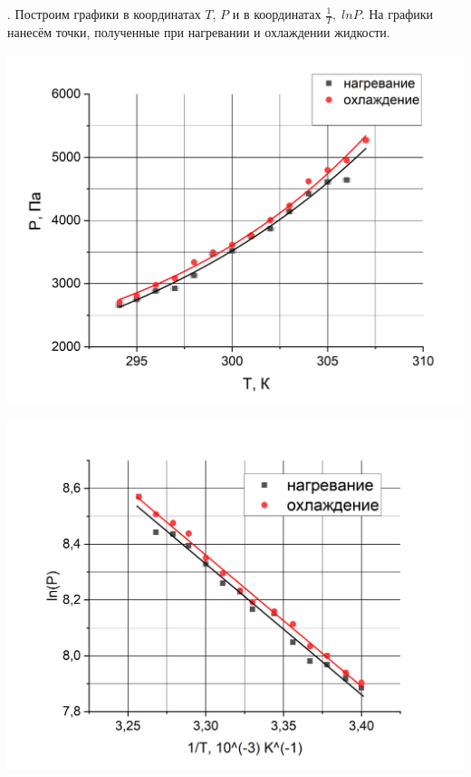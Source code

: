 \documentclass[a4paper,12pt]{article} %
\begin{document}
\medskip
\medskip


. Построим графики в координатах $T$, $P$ и в координатах $\frac{1}{T}, \; ln P$. На графики нанесём точки, полученные при нагревании и охлаждении жидкости.

\medskip

\begin{minipage}{.50\textwidth}
  \centering
  \includegraphics[scale={0.5}]{3.png}
\end{minipage}


\begin{minipage}{.50\textwidth}
  \centering
  \includegraphics[scale={0.5}]{2.png}
\end{minipage}
\end{document}
